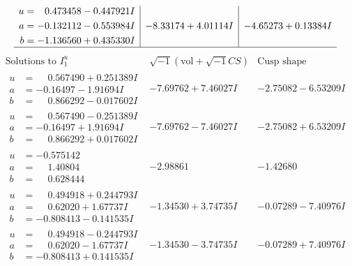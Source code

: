 \documentclass[1p]{elsarticle_modified}
\theoremstyle{definition}
\newcommand{\I}{\sqrt{-1}}
\begin{document}
$$\begin{array}{c|c|c}
\begin{aligned}
u &= \phantom{-}0.473458 - 0.447921 I \\
a &= -0.132112 - 0.553984 I \\
b &= -1.136560 + 0.435330 I\end{aligned}
 & -8.33174 + 4.01114 I & -4.65273 + 0.13384 I\\
 \hline 
 \end{array}$$\newpage$$\begin{array}{c|c|c}  
\text{Solutions to }I^u_{1}& \I (\text{vol} + \sqrt{-1}CS) & \text{Cusp shape}\\
 \hline 
\begin{aligned}
u &= \phantom{-}0.567490 + 0.251389 I \\
a &= -0.16497 - 1.91694 I \\
b &= \phantom{-}0.866292 - 0.017602 I\end{aligned}
 & -7.69762 + 7.46027 I & -2.75082 - 6.53209 I \\ \hline\begin{aligned}
u &= \phantom{-}0.567490 - 0.251389 I \\
a &= -0.16497 + 1.91694 I \\
b &= \phantom{-}0.866292 + 0.017602 I\end{aligned}
 & -7.69762 - 7.46027 I & -2.75082 + 6.53209 I \\ \hline\begin{aligned}
u &= -0.575142\phantom{ +0.000000I} \\
a &= \phantom{-}1.40804\phantom{ +0.000000I} \\
b &= \phantom{-}0.628444\phantom{ +0.000000I}\end{aligned}
 & -2.98861\phantom{ +0.000000I} & -1.42680\phantom{ +0.000000I} \\ \hline\begin{aligned}
u &= \phantom{-}0.494918 + 0.244793 I \\
a &= \phantom{-}0.62020 + 1.67737 I \\
b &= -0.808413 - 0.141535 I\end{aligned}
 & -1.34530 + 3.74735 I & -0.07289 - 7.40976 I \\ \hline\begin{aligned}
u &= \phantom{-}0.494918 - 0.244793 I \\
a &= \phantom{-}0.62020 - 1.67737 I \\
b &= -0.808413 + 0.141535 I\end{aligned}
 & -1.34530 - 3.74735 I & -0.07289 + 7.40976 I \\ \hline\begin{aligned}

\end{aligned}
\end{array}$$
\end{document}
